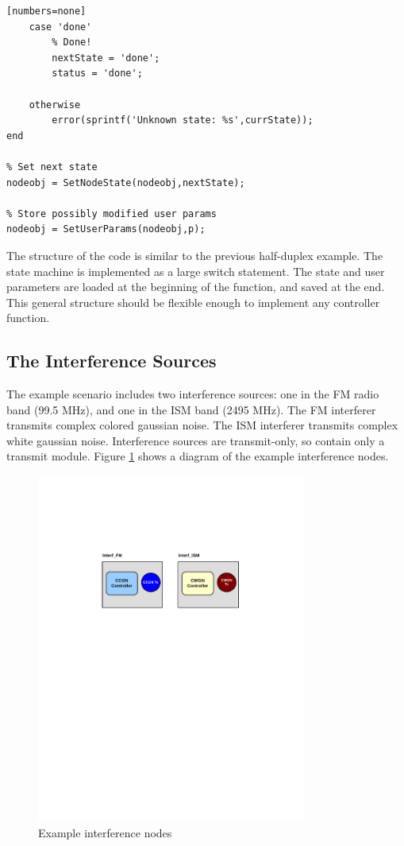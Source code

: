 \begin{lstlisting}[name=fdController, firstnumber=24][numbers=none]
    case 'done'
        % Done!
        nextState = 'done';
        status = 'done';
                
    otherwise
        error(sprintf('Unknown state: %s',currState));
end

% Set next state
nodeobj = SetNodeState(nodeobj,nextState);

% Store possibly modified user params
nodeobj = SetUserParams(nodeobj,p);
\end{lstlisting}

The structure of the code is similar to the previous half-duplex
example.  The state machine is implemented as a large switch
statement.  The state and user parameters are loaded at the
beginning of the function, and saved at the end.  This general
structure should be flexible enough to implement any controller
function.

\subsection{The Interference Sources}
\label{sec:interference_source}
The example scenario includes two interference sources: one in the
FM radio band (99.5 MHz), and one in the ISM band (2495 MHz). The FM
interferer transmits complex colored gaussian noise. The ISM
interferer transmits complex white gaussian noise. Interference
sources are transmit-only, so contain only a transmit module. Figure
\ref{fig:interfNodes} shows a diagram of the example interference
nodes.

\begin{figure}[h]
\centering
\includegraphics[width=3.5in]{figs/Interf_Example}
\caption{Example interference nodes} \label{fig:interfNodes}
\end{figure}

